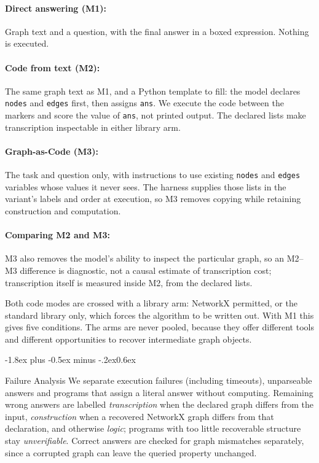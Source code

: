 \documentclass[11pt]{article}
\makeatletter
\renewcommand\subsection{\@startsection{subsection}{2}{\z@}
  {-1.8ex plus -0.5ex minus -.2ex}{0.6ex}
  {\normalsize\bfseries\raggedright}}
\makeatother
\begin{document}
\paragraph{Direct answering (M1):}
Graph text and a question, with the final answer in a boxed expression. Nothing is
executed.

\paragraph{Code from text (M2):}
The same graph text as M1, and a Python template to fill: the model declares
\texttt{nodes} and \texttt{edges} first, then assigns \texttt{ans}. We execute the
code between the markers and score the value of \texttt{ans}, not printed output.
The declared lists make transcription inspectable in either library arm.

\paragraph{Graph-as-Code (M3):}
The task and question only, with instructions to use existing \texttt{nodes} and
\texttt{edges} variables whose values it never sees. The harness supplies those
lists in the variant's labels and order at execution, so M3 removes copying while
retaining construction and computation.

\paragraph{Comparing M2 and M3:}
M3 also removes the model's ability to inspect the particular graph, so an M2--M3
difference is diagnostic, not a causal estimate of transcription cost;
transcription itself is measured inside M2, from the declared lists.

Both code modes are crossed with a library arm: NetworkX permitted, or the standard
library only, which forces the algorithm to be written out. With M1 this gives five
conditions. The arms are never pooled, because they offer different tools and
different opportunities to recover intermediate graph objects.

\subsection{Failure Analysis}
We separate execution failures (including timeouts), unparseable answers and
programs that assign a literal answer without computing. Remaining wrong answers are
labelled \emph{transcription} when the declared graph differs from the input,
\emph{construction} when a recovered NetworkX graph differs from that declaration,
and otherwise \emph{logic}; programs with too little recoverable structure stay
\emph{unverifiable}. Correct answers are checked for graph mismatches separately,
since a corrupted graph can leave the queried property unchanged.
\end{document}
